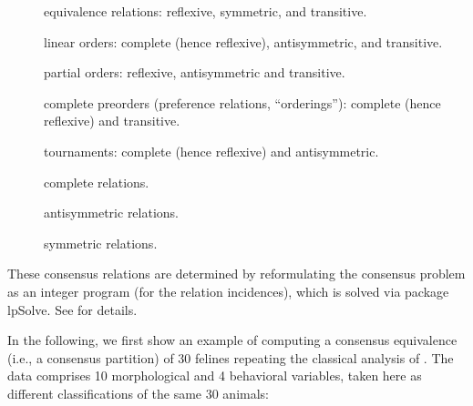 \documentclass[fleqn]{article}
\newcommand{\pkg}[1]{{\normalfont\fontseries{b}\selectfont #1}}
\newcommand{\dQuote}[1]{``{#1}''}
\begin{document}
\begin{description}
\begin{description}
     \item[] equivalence relations: reflexive, symmetric, and
        transitive.
     \item[] linear orders: complete (hence reflexive),
        antisymmetric, and transitive.
     \item[] partial orders: reflexive, antisymmetric and
        transitive.
     \item[] complete preorders (preference relations,
        \dQuote{orderings}): complete (hence reflexive) and transitive.
     \item[] tournaments: complete (hence reflexive) and
        antisymmetric.
     \item[] complete relations.
     \item[] antisymmetric relations.
     \item[] symmetric relations.
    \end{description}
    These consensus relations are determined by reformulating the
    consensus problem as an integer program (for the relation
    incidences), which is solved via package \pkg{lpSolve}.  See
    \cite{ranking:Hornik+Meyer:2007} for details.
\end{description}

In the following, we first show an example of computing a consensus
equivalence (i.e., a consensus partition) of 30 felines repeating the
classical analysis of \cite{ranking:Marcotorchino+Michaud:1982}.  The
data comprises 10 morphological and 4 behavioral variables, taken here
as different classifications of the same 30 animals:
\end{document}
